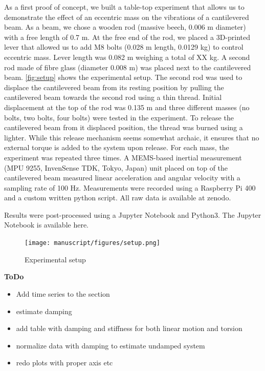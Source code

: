 \documentclass{article}
\begin{document}
As a first proof of concept, we built a table-top experiment that allows us to demonstrate the effect of an eccentric mass on the vibrations of a cantilevered beam. As a beam, we chose a wooden rod (massive beech, 0.006 m diameter) with a free length of 0.7 m. At the free end of the rod, we placed a 3D-printed lever that allowed us to add M8 bolts (0.028 m length, 0.0129 kg) to control eccentric mass. Lever length was 0.082 m weighing a total of XX kg. A second rod made of fibre glass (diameter 0.008 m) was placed next to the cantilevered beam. \autoref{fig:setup} shows the experimental setup. The second rod was used to displace the cantilevered beam from its resting position  by pulling the cantilevered beam towards the second rod using a thin thread. Initial displacement at the top of the rod was 0.135 m and three different masses (no bolts, two bolts, four bolts) were tested in the experiment. To release the cantilevered beam from it displaced position, the thread was burned using a lighter. While this release mechanism seems somewhat archaic, it ensures that no external torque is added to the system upon release. For each mass, the experiment was repeated three times. A MEMS-based inertial measurement (MPU 9255, InvenSense TDK, Tokyo, Japan) unit placed on top of the cantilevered beam measured linear acceleration and angular velocity with a sampling rate of 100 Hz. Measurements were recorded using a Raspberry Pi 400 and a custom written python script. All raw data is available at zenodo. 

Results were post-processed using a Jupyter Notebook and Python3. The Jupyter Notebook is available here. 

\begin{figure}[ht!]
    \centering
    \texttt{[image: manuscript/figures/setup.png]}
    \caption{Experimental setup}
    \label{fig:setup}
\end{figure}

\clearpage

\textbf{ToDo}

\begin{itemize}
    \item Add time series to the section
    \item estimate damping
    \item add table with damping and stiffness for both linear motion and torsion
    \item normalize data with damping to estimate undamped system
    \item redo plots with proper axis etc
\end{itemize}
\end{document}
